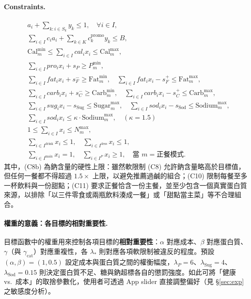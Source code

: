 \documentclass[a4paper]{article}
\begin{document}
\paragraph{Constraints.}\leavevmode
\begin{align}
&a_i + \sum_{k:i\in S_k} y_k \le 1, \quad \forall i \in I, \tag{C1: 互斥}\\
&\sum_{i\in I} c_i a_i + \sum_{k\in K} c_k^{\text{promo}} y_k \le B, \tag{C2: 預算}\\
&\text{Cal}^{\min}_m \le \sum_{i\in I} cal_i x_i \le \text{Cal}^{\max}_m, \tag{C3: 熱量區間（硬）}\\
&\sum_{i\in I} pro_i x_i + s_P \ge P^{\min}_m, \tag{C4: 蛋白質（軟）}\\
&\sum_{i\in I} fat_i x_i + s^-_{F} \ge \text{Fat}^{\min}_m,\quad \sum_{i\in I} fat_i x_i - s^+_{F} \le \text{Fat}^{\max}_m, \tag{C5: 脂肪（軟）}\\
&\sum_{i\in I} carb_i x_i + s^-_{C} \ge \text{Carb}^{\min}_m,\quad \sum_{i\in I} carb_i x_i - s^+_{C} \le \text{Carb}^{\max}_m, \tag{C6: 碳水（軟）}\\
&\sum_{i\in I} sug_i x_i - s_{\text{Sug}} \le \text{Sugar}^{\max}_m, \quad \sum_{i\in I} sod_i x_i - s_{\text{Sod}} \le \text{Sodium}^{\max}_m, \tag{C7--8: 糖/鈉（軟）}\\
&\sum_{i\in I} sod_i x_i \le \kappa\cdot \text{Sodium}^{\max}_m, \quad (\kappa = 1.5) \tag{C8b: 鈉硬上限}\\
&1 \le \sum_{i\in I} x_i \le N^{\max}_m, \tag{C9: 數量}\\
&\sum_{i\in I^{\mathrm{drink}}} x_i \le 1, \quad \sum_{i\in I^{\mathrm{dess}}} x_i \le 1, \tag{C10: 餐型結構}\\
&\sum_{i\in I^{\mathrm{main}}} x_i = 1, \quad \sum_{i\in I^{P}} x_i \ge 1, \quad \text{當 } m = \text{正餐模式}. \tag{C11: 主餐+蛋白}
\end{align}
其中，(C8b) 為鈉含量的硬性上限：雖然軟限制 (C8) 允許鈉含量略高於目標值，但任何一餐都不得超過 $1.5\times$ 上限，以避免推薦過鹹的組合；(C10) 限制每餐至多一杯飲料與一份甜點；(C11) 要求正餐恰含一份主餐，並至少包含一個真實蛋白質來源，以排除「以三件零食或兩瓶飲料湊成一餐」或「甜點當主菜」等不合理組合。

\paragraph{權重的意義：各目標的相對重要性.} 目標函數中的權重用來控制各項目標的\textbf{相對重要性}：$\alpha$ 對應成本、$\beta$ 對應蛋白質、$\gamma$（與 $\gamma_{\text{cat}}$）對應重複性，各 $\lambda_*$ 則對應各項軟限制被違反的程度。預設 $(\alpha,\beta)=(1,0.5)$ 設定成本與蛋白質之間的權衡幅度，$\lambda_P=6$、$\lambda_{\text{Sug}}=4$、$\lambda_{\text{Sod}}=0.15$ 則決定蛋白質不足、糖與鈉超標各自的懲罰強度。如此可將「健康 vs.\ 成本」的取捨參數化，使用者可透過 App slider 直接調整偏好（見 \S\ref{sec:exp} 之敏感度分析）。
\end{document}
